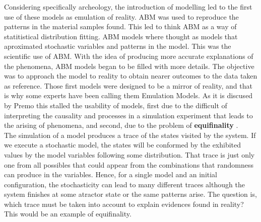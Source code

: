\documentclass[11pt,oneside,a4paper,openright]{report}
\begin{document}
Considering specifically archeology, the introduction of modelling led to the first use of these models as emulation of reality. ABM was used to reproduce the patterns in the material samples found. This led to think ABM as a way of statitistical distribution fitting. ABM models where thought as models that aproximated stochastic variables and patterns in the model. This was the scientific use of ABM. With the idea of producing more accurate explanations of the phenomena, ABM models began to be filled with more details. The objective was to approach the model to reality to obtain nearer outcomes to the data taken as reference. Those first models were designed to be a mirror of reality, and that is why some experts have been calling them Emulation Models. As it is discused by Premo \cite[p.33]{Premo2010} this stalled the usability of models, first due to the difficult of interpreting the causality and processes in a simulation experiment that leads to the arising of phenomena, and second, due to the problem of \textbf{equifinality} \cite[p.31]{Premo2010}.\\
The simulation of a model produces a trace of the states visited by the system. If we execute a stochastic model, the states will be conformed by the exhibited values by the model variables following some distribution. That trace is just only one from all possibles that could appear from the combinations that randomness can produce in the variables. Hence, for a single model and an initial configuration, the stochasticity can lead to many different traces although the system finishes at some atractor state or the same patterns arise. The question is, which trace must be taken into account to explain evidences found in reality? This would be an example of equifinality.\\ 
%
\end{document}
